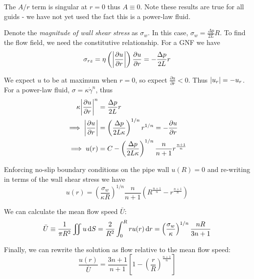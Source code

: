 \documentclass{jknotes}
\newcommand{\srate}{\dot{\gamma}}
\begin{document}
The $A/r$ term is singular at $r=0$ thus $A \equiv 0$. Note these results are
true for all guids - we have not yet used the fact this is a power-law fluid.

Denote the \emph{magnitude of wall shear stress} as $\sigma_w$. In this case,
$\sigma_w = \frac{\Delta p}{2L}R$.  To find the flow field, we need the
constitutive relationship. For a GNF we have
\begin{equation}
	\sigma_{rz} = \eta\left(\abs{\frac{\partial u}{\partial r}}\right)
	\frac{\partial u}{\partial r} = -\frac{\Delta p}{2L} r
\end{equation}

We expect $u$ to be at maximum when $r=0$, so expect $\frac{\partial
u}{\partial r} < 0$. Thus $\abs{u_r} = -u_r$. For a power-law fluid, $\sigma =
\kappa \srate^n$, thus
\begin{equation}
	\begin{aligned}
		\kappa \abs{\frac{\partial u}{\partial r}}^n &= \frac{\Delta p}{2L} r
		\\
		\implies \abs{\frac{\partial u}{\partial r}} &= \left(\frac{\Delta p}{2
		L \kappa}\right)^{1/n} r^{1/n} = -\frac{\partial u}{\partial r} \\
		\implies u(r) &= C - \left(\frac{\Delta p}{2 L \kappa}\right)^{1/n}
		\frac{n}{n+1} r^{\frac{n+1}{n}}
	\end{aligned}
\end{equation}

Enforcing no-slip boundary conditions on the pipe wall $u(R) = 0$ and
re-writing in terms of the wall shear stress we have
\begin{equation}
	u(r) = \left(\frac{\sigma_w}{\kappa R}\right)^{1/n} \frac{n}{n+1}\left(
	R^{\frac{n+1}{n}} - r^{\frac{n+1}{n}}\right)
\end{equation}

We can calculate the mean flow speed $\bar{U}$:
\begin{equation}
	\bar{U} \equiv \frac{1}{\pi R^2} \iint u \, \diffd S = \frac{2}{R^2}
	\int_0^R ru(r) \, \diffd r = \left(\frac{\sigma_w}{\kappa}\right)^{1/n}
	\frac{nR}{3n+1}
\end{equation}

Finally, we can rewrite the solution as flow relative to the mean flow speed:
\begin{equation}
	\frac{u(r)}{\bar{U}} = \frac{3n+1}{n+1} \left[ 1-
	\left(\frac{r}{R}\right)^{\frac{n+1}{n}}\right]
\end{equation}

\begin{center}
\end{center}
\end{document}
